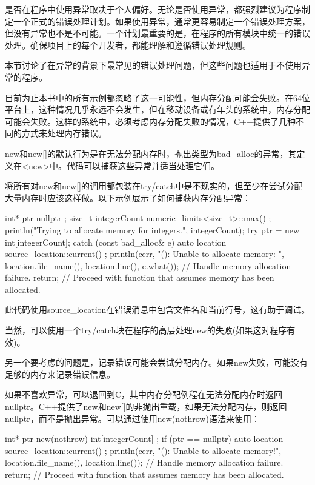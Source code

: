 
是否在程序中使用异常取决于个人偏好。无论是否使用异常，都强烈建议为程序制定一个正式的错误处理计划。如果使用异常，通常更容易制定一个错误处理方案，但没有异常也不是不可能。一个计划最重要的是，在程序的所有模块中统一的错误处理。确保项目上的每个开发者，都能理解和遵循错误处理规则。

本节讨论了在异常的背景下最常见的错误处理问题，但这些问题也适用于不使用异常的程序。


目前为止本书中的所有示例都忽略了这一可能性，但内存分配可能会失败。在64位平台上，这种情况几乎永远不会发生，但在移动设备或有年头的系统中，内存分配可能会失败。这样的系统中，必须考虑内存分配失败的情况，C++提供了几种不同的方式来处理内存错误。

new和new[]的默认行为是在无法分配内存时，抛出类型为bad\_alloc的异常，其定义在<new>中。代码可以捕获这些异常并适当处理它们。

将所有对new和new[]的调用都包装在try/catch中是不现实的，但至少在尝试分配大量内存时应该这样做。以下示例展示了如何捕获内存分配异常：

\begin{cpp}
int* ptr { nullptr };
size_t integerCount { numeric_limits<size_t>::max() };
println("Trying to allocate memory for {} integers.", integerCount);
try {
    ptr = new int[integerCount];
} catch (const bad_alloc& e) {
    auto location { source_location::current() };
    println(cerr, "{}({}): Unable to allocate memory: {}",
        location.file_name(), location.line(), e.what());
    // Handle memory allocation failure.
    return;
}
// Proceed with function that assumes memory has been allocated.
\end{cpp}

此代码使用source\_location在错误消息中包含文件名和当前行号，这有助于调试。

当然，可以使用一个try/catch块在程序的高层处理new的失败(如果这对程序有效)。

另一个要考虑的问题是，记录错误可能会尝试分配内存。如果new失败，可能没有足够的内存来记录错误信息。


如果不喜欢异常，可以退回到C，其中内存分配例程在无法分配内存时返回nullptr。C++提供了new和new[]的非抛出重载，如果无法分配内存，则返回nullptr，而不是抛出异常。可以通过使用new(nothrow)语法来使用：

\begin{cpp}
int* ptr { new(nothrow) int[integerCount] };
if (ptr == nullptr) {
    auto location { source_location::current() };
    println(cerr, "{}({}): Unable to allocate memory!",
        location.file_name(), location.line());
    // Handle memory allocation failure.
    return;
}
// Proceed with function that assumes memory has been allocated.
\end{cpp}

